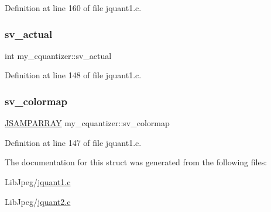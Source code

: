 Definition at line 160 of file jquant1.\+c.

\mbox{\label{structmy__cquantizer_a9fcddbecf01942c4976e271de23effd5}} 
\subsubsection{\texorpdfstring{sv\_actual}{sv\_actual}}
{\footnotesize\ttfamily int my\+\_\+cquantizer\+::sv\+\_\+actual}



Definition at line 148 of file jquant1.\+c.

\mbox{\label{structmy__cquantizer_a9d0cd4d81691db3ec5f01e68fe6537bd}} 
\subsubsection{\texorpdfstring{sv\_colormap}{sv\_colormap}}
{\footnotesize\ttfamily \mbox{\hyperlink{jpeglib_8h_ac9d5d1b829ed51769db69a37271a7e91}{J\+S\+A\+M\+P\+A\+R\+R\+AY}} my\+\_\+cquantizer\+::sv\+\_\+colormap}



Definition at line 147 of file jquant1.\+c.



The documentation for this struct was generated from the following files\+:\begin{DoxyCompactItemize}
\item 
Lib\+Jpeg/\mbox{\hyperlink{jquant1_8c}{jquant1.\+c}}\item 
Lib\+Jpeg/\mbox{\hyperlink{jquant2_8c}{jquant2.\+c}}\end{DoxyCompactItemize}
